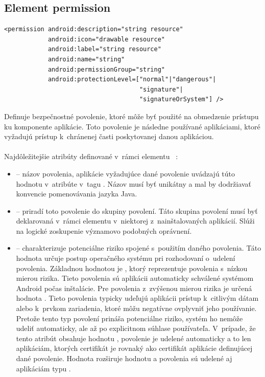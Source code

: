 \subsection{Element permission}
\lstset{language=XML}
\begin{lstlisting}
<permission android:description="string resource"
            android:icon="drawable resource"
            android:label="string resource"
            android:name="string"
            android:permissionGroup="string"
            android:protectionLevel=["normal"|"dangerous"| 
                                     "signature"|
                                     "signatureOrSystem"] />
\end{lstlisting}
Definuje bezpečnostné povolenie, ktoré môže byť použité na obmedzenie prístupu ku komponente aplikácie. Toto povolenie je následne používané aplikáciami, ktoré vyžadujú prístup k~chránenej časti poskytovanej danou aplikáciou.\\\\ Najdôležitejšie atribúty definované v~rámci elementu ~\cite{elPerm}:\\
\begin{itemize}
\item {} -- názov povolenia, aplikácie vyžadujúce dané povolenie uvádzajú túto hodnotu v~atribúte  v~tagu . Názov musí byť unikátny a mal by dodržiavať konvencie pomenovávania jazyka Java.
\item {} -- priradí toto povolenie do skupiny povolení. Táto skupina povolení musí byť deklarovaná v~rámci elementu  v~niektorej z~nainštalovaných aplikácií. Slúži na logické zoskupenie významovo podobných oprávnení.
\item {} -- charakterizuje potenciálne riziko spojené s~použitím daného povolenia. Táto hodnota určuje postup operačného systému pri rozhodovaní o~udelení povolenia. 
Základnou hodnotou je , ktorý reprezentuje povolenia s~nízkou mierou rizika. Tieto povolenia sú aplikácii automaticky schválené systémom Android počas inštalácie. Pre povolenia z~zvýšenou mierou rizika je určená hodnota . Tieto povolenia typicky udeľujú aplikácii prístup k~citlivým dátam alebo k~prvkom zariadenia, ktoré môžu negatívne ovplyvniť jeho používanie. Pretože tento typ povolení prináša potenciálne riziko, systém ho nemôže udeliť automaticky, ale až po explicitnom súhlase používateľa.
V~prípade, že tento atribút obsahuje hodnotu , povolenie je udelené automaticky a to len aplikáciám, ktorých certifikát je rovnaký ako certifikát aplikácie definujúcej dané povolenie.   
Hodnota  rozširuje hodnotu  a povolenia sú udelené aj aplikáciám typu .
\end{itemize}

